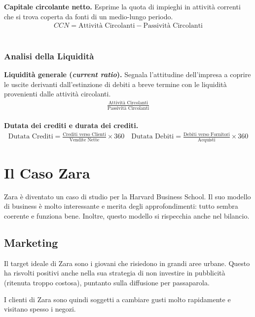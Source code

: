 \documentclass[a4paper,portrait,12pt]{article}
\theoremstyle{definition}
\begin{document}
\textbf{Capitale circolante netto.}
Esprime la quota di impieghi in attività correnti che si trova coperta da fonti di un medio-lungo periodo.
\begin{align*}
CCN = \text{Attività Circolanti} - \text{Passività Circolanti}
\end{align*}\\

\subsubsection{Analisi della Liquidità}

\textbf{Liquidità generale (\emph{current ratio}).}
Segnala l'attitudine dell'impresa a coprire le uscite derivanti dall'estinzione di debiti a breve termine con le liquidità provenienti dalle attività circolanti.
\begin{align*}
\frac{\text{Attività Circolanti}}{\text{Passività Circolanti}}
\end{align*}\\

\textbf{Dutata dei crediti e durata dei crediti.}
\begin{align*}
\text{Dutata Crediti} = \frac{\text{Crediti verso Clienti}}{\text{Vendite Nette}} \times 360 \quad \text{Dutata Debiti} = \frac{\text{Debiti verso Fornitori}}{\text{Acquisti}} \times 360
\end{align*}


\newpage
\section{Il Caso Zara}




Zara è diventato un caso di studio per la Harvard Business School.
Il suo modello di business è molto interessante e merita degli approfondimenti: tutto sembra coerente e funziona bene.
Inoltre, questo modello si rispecchia anche nel bilancio.

\subsection{Marketing}
Il target ideale di Zara sono i giovani che risiedono in grandi aree urbane.
Questo ha risvolti positivi anche nella sua strategia di non investire in pubblicità (ritenuta troppo costosa), puntanto sulla diffusione per passaparola.

I clienti di Zara sono quindi soggetti a cambiare gusti molto rapidamente e visitano spesso i negozi.
\end{document}
